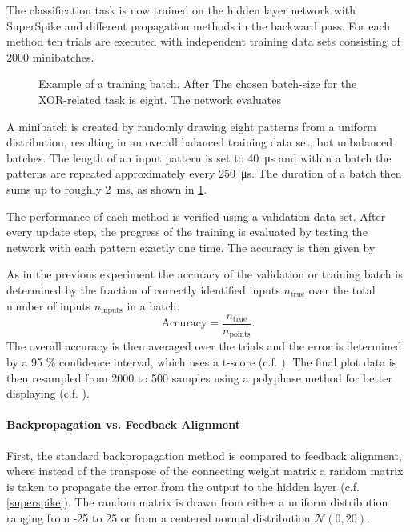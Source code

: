 The classification task is now trained on the hidden layer network with SuperSpike and different propagation methods in the backward pass. For each method ten trials are executed with independent training data sets consisting of 2000 minibatches. 

\begin{figure}
	\centering
	
	\caption[Example of a training batch.]{Example of a training batch. After The chosen batch-size for the XOR-related task is eight. The network evaluates}
	\label{batchpatterns}
\end{figure}

A minibatch is created by randomly drawing eight patterns from a uniform distribution, resulting in an overall balanced training data set, but unbalanced batches. The length of an input pattern is set to \SI{40}{\micro \s} and within a batch the patterns are repeated approximately every \SI{250}{\micro \s}. The duration of a batch then sums up to roughly \SI{2}{\milli \s}, as shown in \cref{batchpatterns}.

The performance of each method is verified using a validation data set. After every update step, the progress of the training is evaluated by testing the network with each pattern exactly one time. The accuracy is then given by 

As in the previous experiment the accuracy of the validation or training batch is determined by the fraction of correctly identified inputs $n_\text{true}$ over the total number of inputs $n_\text{inputs}$ in a batch.
\begin{equation}
\text{Accuracy} = \frac{n_\text{true}}{n_\text{points}}.
\end{equation}
The overall accuracy is then averaged over the trials and the error is determined by a 95 \% confidence interval, which uses a t-score (c.f. \citealp{Smithson2011}). The final plot data is then resampled from 2000 to 500 samples using a polyphase method for better displaying (c.f. \citealp{scipypolyresample}).

\paragraph{Backpropagation vs. Feedback Alignment}
First, the standard backpropagation method is compared to feedback alignment, where instead of the transpose of the connecting weight matrix a random matrix is taken to propagate the error from the output to the hidden layer (c.f. \cref{superspike}). The random matrix is drawn from either a uniform distribution ranging from -25 to 25 or from a centered normal distribution $\mathcal{N}(0, 20)$.

